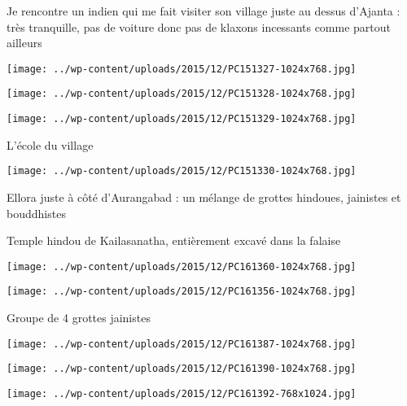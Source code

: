 Je rencontre un indien qui me fait visiter son village juste au dessus d'Ajanta : très tranquille, pas de voiture donc pas de klaxons incessants comme partout ailleurs 
\begin{center} \texttt{[image: ../wp-content/uploads/2015/12/PC151327-1024x768.jpg]} \end{center}
\begin{center} \texttt{[image: ../wp-content/uploads/2015/12/PC151328-1024x768.jpg]} \end{center}
\begin{center} \texttt{[image: ../wp-content/uploads/2015/12/PC151329-1024x768.jpg]} \end{center}

L'école du village 
\begin{center} \texttt{[image: ../wp-content/uploads/2015/12/PC151330-1024x768.jpg]} \end{center}
\pagebreak

Ellora juste à côté d'Aurangabad : un mélange de grottes hindoues, jainistes et bouddhistes 

Temple hindou de Kailasanatha, entièrement excavé dans la falaise 
\begin{center} \texttt{[image: ../wp-content/uploads/2015/12/PC161360-1024x768.jpg]} \end{center}
\begin{center} \texttt{[image: ../wp-content/uploads/2015/12/PC161356-1024x768.jpg]} \end{center}
\pagebreak

Groupe de 4 grottes jainistes 
\begin{center} \texttt{[image: ../wp-content/uploads/2015/12/PC161387-1024x768.jpg]} \end{center}
\begin{center} \texttt{[image: ../wp-content/uploads/2015/12/PC161390-1024x768.jpg]} \end{center}
\begin{center} \texttt{[image: ../wp-content/uploads/2015/12/PC161392-768x1024.jpg]} \end{center}

